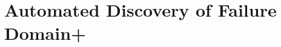 \documentclass[conference]{IEEEtran}
\begin{document}
\section{Automated Discovery of Failure Domain+}\label{sec:adfd+}




\end{document}
